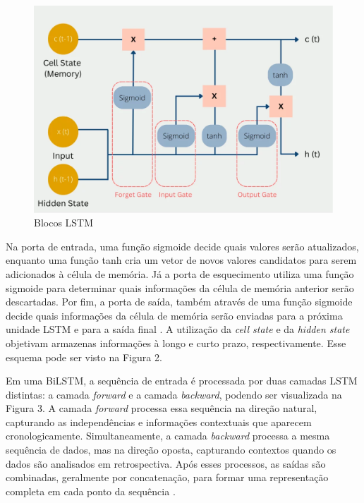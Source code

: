 \documentclass[conference]{IEEEtran}
\begin{document}
\begin{figure}[h!]
    \centering
    \includegraphics[width=\linewidth]{images/lstm.png}
    \caption{Blocos LSTM}
    \label{fig:exemplo1}
\end{figure}

Na porta de entrada, uma função sigmoide decide quais valores serão atualizados, enquanto uma função tanh cria um vetor de novos valores candidatos para serem adicionados à célula de memória. Já a porta de esquecimento utiliza uma função sigmoide para determinar quais informações da célula de memória anterior serão descartadas. Por fim, a porta de saída, também através de uma função sigmoide decide quais informações da célula de memória serão enviadas para a próxima unidade LSTM e para a saída final \cite{lstms}. A utilização da \textit{cell state} e da \textit{hidden state} objetivam armazenas informações à longo e curto prazo, respectivamente. Esse esquema pode ser visto na Figura 2.

\indent Em uma BiLSTM, a sequência de entrada é processada por duas camadas LSTM distintas: a camada \textit{forward} e a camada \textit{backward}, podendo ser visualizada na Figura 3. A camada \textit{forward} processa essa sequência na direção natural, capturando as independências e informações contextuais que aparecem cronologicamente. Simultaneamente, a camada \textit{backward} processa a mesma sequência de dados, mas na direção oposta, capturando contextos quando os dados são analisados em retrospectiva. Após esses processos, as saídas são combinadas, geralmente por concatenação, para formar uma representação completa em cada ponto da sequência \cite{bilstm}.
\end{document}
